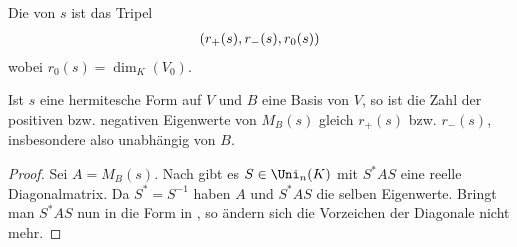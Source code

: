 \begin{definition}[Signatur]
	Die  von $s$ ist das Tripel
	\begin{align}
		(r_+(s),r_-(s),r_0(s))\notag
	\end{align}
	wobei $r_0(s)=\dim_K(V_0)$.
\end{definition}

\begin{conclusion}
	Ist $s$ eine hermitesche Form auf $V$ und $B$ eine Basis von $V$, so ist die Zahl der positiven bzw. negativen Eigenwerte von $M_B(s)$ gleich $r_+(s)$ bzw. $r_-(s)$, insbesondere also unabhängig von $B$.
\end{conclusion}
\begin{proof}
	Sei $A=M_B(s)$. Nach  gibt es $S\in\Uni_n(K)$ mit $S^*AS$ eine reelle Diagonalmatrix. Da $S^*=S^{-1}$ haben $A$ und $S^*AS$ die selben Eigenwerte. Bringt man $S^*AS$ nun in die Form in , so ändern sich die Vorzeichen der Diagonale nicht mehr.
\end{proof}